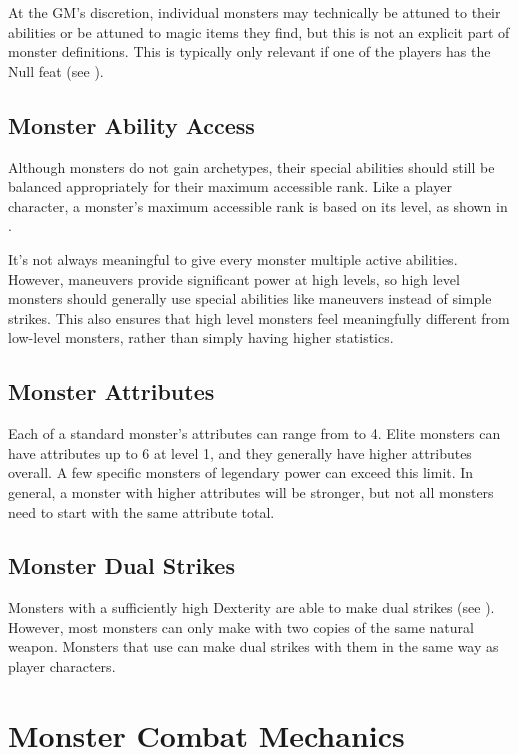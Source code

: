     At the GM's discretion, individual monsters may technically be attuned to their abilities or be attuned to magic items they find, but this is not an explicit part of monster definitions.
    This is typically only relevant if one of the players has the Null feat (see ).

  \subsection{Monster Ability Access}\label{Monster Ability Access}
    Although monsters do not gain archetypes, their special abilities should still be balanced appropriately for their maximum accessible rank.
    Like a player character, a monster's maximum accessible rank is based on its level, as shown in .

    It's not always meaningful to give every monster multiple active abilities.
    However, maneuvers provide significant power at high levels, so high level monsters should generally use special abilities like maneuvers instead of simple strikes.
    This also ensures that high level monsters feel meaningfully different from low-level monsters, rather than simply having higher statistics.

  \subsection{Monster Attributes}\label{Monster Attributes}
    Each of a standard monster's attributes can range from  to 4.
    Elite monsters can have attributes up to 6 at level 1, and they generally have higher attributes overall.
    A few specific monsters of legendary power can exceed this limit.
    In general, a monster with higher attributes will be stronger, but not all monsters need to start with the same attribute total.

  \subsection{Monster Dual Strikes}\label{Monster Dual Strikes}
    Monsters with a sufficiently high Dexterity are able to make dual strikes (see ).
    However, most monsters can only make  with two copies of the same  natural weapon.
    Monsters that use  can make dual strikes with them in the same way as player characters.

\section{Monster Combat Mechanics}

